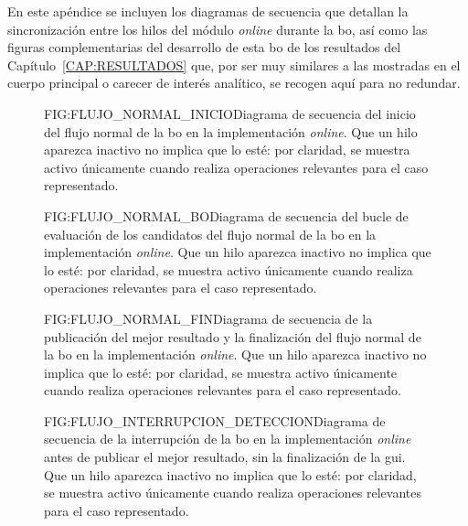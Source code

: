 
En este apéndice se incluyen los diagramas de secuencia que detallan la sincronización entre los hilos del módulo \textit{online} durante la \ac{bo}, así como las figuras complementarias del desarrollo de esta \ac{bo} de los resultados del Capítulo~\ref{CAP:RESULTADOS} que, por ser muy similares a las mostradas en el cuerpo principal o carecer de interés analítico, se recogen aquí para no redundar.


\begin{figure}[Sincronización de los hilos en el inicio del flujo normal de la \acl{bo} en la implementación \textit{online}]{FIG:FLUJO_NORMAL_INICIO}{Diagrama de secuencia del inicio del flujo normal de la \ac{bo} en la implementación \textit{online}. Que un hilo aparezca inactivo no implica que lo esté: por claridad, se muestra activo únicamente cuando realiza operaciones relevantes para el caso representado.}
\end{figure}

\begin{figure}[Sincronización de los hilos en el bucle de evaluación del flujo normal de la \acl{bo} en la implementación \textit{online}]{FIG:FLUJO_NORMAL_BO}{Diagrama de secuencia del bucle de evaluación de los candidatos del flujo normal de la \ac{bo} en la implementación \textit{online}. Que un hilo aparezca inactivo no implica que lo esté: por claridad, se muestra activo únicamente cuando realiza operaciones relevantes para el caso representado.}
\end{figure}

\begin{figure}[Sincronización de los hilos en la publicación y finalización del flujo normal de la \acl{bo} en la implementación \textit{online}]{FIG:FLUJO_NORMAL_FIN}{Diagrama de secuencia de la publicación del mejor resultado y la finalización del flujo normal de la \ac{bo} en la implementación \textit{online}. Que un hilo aparezca inactivo no implica que lo esté: por claridad, se muestra activo únicamente cuando realiza operaciones relevantes para el caso representado.}
\end{figure}

\begin{figure}[Sincronización de los hilos en la detección de la interrupción de la \acl{bo} en la implementación \textit{online}]{FIG:FLUJO_INTERRUPCION_DETECCION}{Diagrama de secuencia de la interrupción de la \ac{bo} en la implementación \textit{online} antes de publicar el mejor resultado, sin la finalización de la \ac{gui}. Que un hilo aparezca inactivo no implica que lo esté: por claridad, se muestra activo únicamente cuando realiza operaciones relevantes para el caso representado.}
\end{figure}

